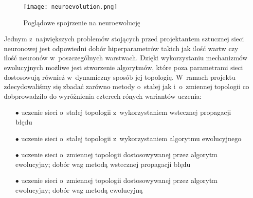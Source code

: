 \begin{figure}
    \centering
    \texttt{[image: neuroevolution.png]}
    \caption{Poglądowe spojrzenie na neuroewolucję}
    \label{neuroevolution}
\end{figure}

Jednym z~największych problemów stojących przed projektantem sztucznej sieci neuronowej jest odpowiedni dobór hiperparametrów takich jak ilość wartw czy ilość neuronów w~poszczególnych warstwach. Dzięki wykorzystaniu mechanizmów ewolucyjnych możliwe jest stworzenie algorytmów, które poza parametrami sieci dostosowują również w~dynamiczny sposób jej topologię. W~ramach projektu zdecydowaliśmy się zbadać zarówno metody o~stałej jak i~o~zmiennej topologii co dobprowadziło do wyróżnienia czterech rónych wariantów uczenia:

\vskip 0.5cm
\begin{itemize}[leftmargin=1cm]
    \item[$\bullet$] uczenie sieci o~stałej topologii z~wykorzystaniem wstecznej propagacji błędu
    \item[$\bullet$] uczenie sieci o~stałej topologii z~wykorzystaniem algorytmu ewolucyjnego
    \item[$\bullet$] uczenie sieci o~zmiennej topologii dostosowywanej przez algorytm ewolucyjny; dobór wag metodą wstecznej propagacji błędu
    \item[$\bullet$] uczenie sieci o~zmiennej topologii dostosowywanej przez algorytm ewolucyjny; dobór wag metodą ewolucyjną
\end{itemize}
\vskip 0.5cm